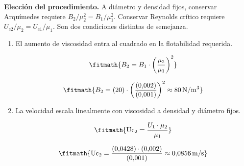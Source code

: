 \noindent\textbf{Elección del procedimiento.} A diámetro y densidad fijos, conservar Arquímedes requiere $B_2/\mu_2^2=B_1/\mu_1^2$. Conservar Reynolds crítico requiere $U_{c2}/\mu_2=U_{c1}/\mu_1$. Son dos condiciones distintas de semejanza.

\begin{enumerate}

\item El aumento de viscosidad entra al cuadrado en la flotabilidad requerida.

\[\fitmath{B_{2}=B_{1}\cdot {\left(\frac{\mu_{2}}{\mu_{1}}\right)}^{2}}\]

\[\fitmath{B_{2}=(20)\cdot {\left(\frac{(0{,}002)}{(0{,}001)}\right)}^{2}\approx 80\,\mathrm{N/m^{3}}}\]

\item La velocidad escala linealmente con viscosidad a densidad y diámetro fijos.

\[\fitmath{\mathrm{Uc}_{2}=\frac{U_{1}\cdot \mu_{2}}{\mu_{1}}}\]

\[\fitmath{\mathrm{Uc}_{2}=\frac{(0{,}0428)\cdot (0{,}002)}{(0{,}001)}\approx 0{,}0856\,\mathrm{m/s}}\]

\end{enumerate}
